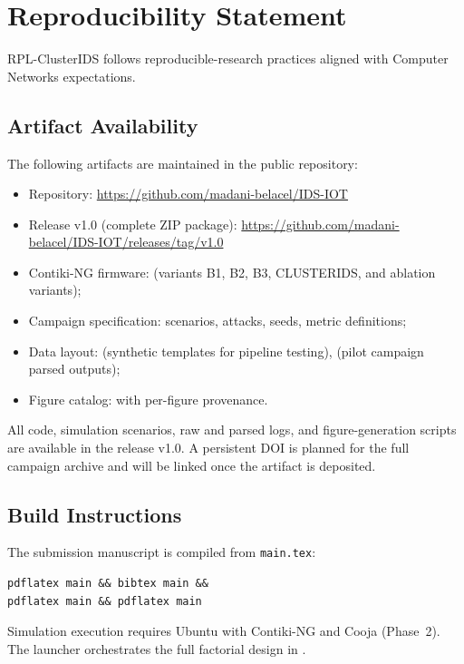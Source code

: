 \section{Reproducibility Statement}
\label{sec:reproducibility}

RPL-ClusterIDS follows reproducible-research practices aligned with Computer Networks expectations.

\subsection{Artifact Availability}
The following artifacts are maintained in the public repository:
\begin{itemize}
  \item Repository: \url{https://github.com/madani-belacel/IDS-IOT}
  \item Release v1.0 (complete ZIP package): \url{https://github.com/madani-belacel/IDS-IOT/releases/tag/v1.0}
  \item Contiki-NG firmware:  (variants B1, B2, B3, CLUSTERIDS, and ablation variants);
  \item Campaign specification: scenarios, attacks, seeds, metric definitions;
  \item Data layout:  (synthetic templates for pipeline testing),  (pilot campaign parsed outputs);
  \item Figure catalog:  with per-figure provenance.
\end{itemize}
All code, simulation scenarios, raw and parsed logs, and figure-generation scripts are available in the release v1.0. A persistent DOI is planned for the full campaign archive and will be linked once the artifact is deposited.

\subsection{Build Instructions}
The submission manuscript is compiled from \texttt{main.tex}:
\begin{verbatim}
pdflatex main && bibtex main &&
pdflatex main && pdflatex main
\end{verbatim}
Simulation execution requires Ubuntu with Contiki-NG and Cooja (Phase~2).
The launcher  orchestrates the full factorial design in .

